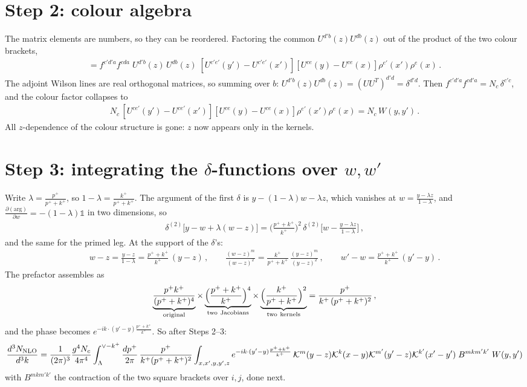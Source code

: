 \documentclass[9pt]{article}
\begin{document}
\section{Step 2: colour algebra}
The matrix elements are numbers, so they can be reordered. Factoring the common
$U^{d'b}(z)U^{db}(z)$ out of the product of the two colour brackets,
\begin{align}
[\,\cdots'][\,\cdots]=f^{c'd'a}f^{cda}\;U^{d'b}(z)\,U^{db}(z)\;
\left[U^{c'e'}(y')-U^{c'e'}(x')\right]\left[U^{ce}(y)-U^{ce}(x)\right]\rho^{e'}(x')\rho^{e}(x)\,.
\end{align}
The adjoint Wilson lines are real orthogonal matrices, so summing over $b$:
$U^{d'b}(z)U^{db}(z)=(UU^{T})^{d'd}=\delta^{d'd}$. Then
$f^{c'd'a}f^{cd'a}=N_{c}\,\delta^{c'c}$, and the colour factor collapses to
\begin{align}
N_{c}\,\left[U^{ce'}(y')-U^{ce'}(x')\right]\left[U^{ce}(y)-U^{ce}(x)\right]\rho^{e'}(x')\rho^{e}(x)
=N_{c}\,W(y,y')\,.
\end{align}
All $z$-dependence of the colour structure is gone: $z$ now appears only in the kernels.

\section{Step 3: integrating the $\delta$-functions over $w,w'$}
Write $\lambda=\frac{p^{+}}{p^{+}+k^{+}}$, so $1-\lambda=\frac{k^{+}}{p^{+}+k^{+}}$. The
argument of the first $\delta$ is $y-(1-\lambda)w-\lambda z$, which vanishes at
$w=\frac{y-\lambda z}{1-\lambda}$, and $\frac{\partial(\text{arg})}{\partial w}=-(1-\lambda)\mathbb 1$ in
two dimensions, so
\begin{align}
\delta^{(2)}\big[y-w+\lambda(w-z)\big]
=\Big(\frac{p^{+}+k^{+}}{k^{+}}\Big)^{2}\,
\delta^{(2)}\Big[w-\frac{y-\lambda z}{1-\lambda}\Big]\,,
\end{align}
and the same for the primed leg. At the support of the $\delta$'s:
\begin{align}
w-z=\frac{y-z}{1-\lambda}=\frac{p^{+}+k^{+}}{k^{+}}\,(y-z)\,,\qquad
\frac{(w-z)^{m}}{(w-z)^{2}}=\frac{k^{+}}{p^{+}+k^{+}}\,\frac{(y-z)^{m}}{(y-z)^{2}}\,,\qquad
w'-w=\frac{p^{+}+k^{+}}{k^{+}}\,(y'-y)\,.
\end{align}
The prefactor assembles as
\begin{align}
\underbrace{\frac{p^{+}k^{+}}{(p^{+}+k^{+})^{4}}}_{\rm original}\times
\underbrace{\Big(\frac{p^{+}+k^{+}}{k^{+}}\Big)^{4}}_{\rm two\ Jacobians}\times
\underbrace{\Big(\frac{k^{+}}{p^{+}+k^{+}}\Big)^{2}}_{\rm two\ kernels}
=\frac{p^{+}}{k^{+}\,(p^{+}+k^{+})^{2}}\,,
\end{align}
and the phase becomes $e^{-ik\cdot(y'-y)\frac{p^{+}+k^{+}}{k^{+}}}$. So after Steps 2--3:
\begin{align}\label{eq:afterdelta}
\frac{d^{3}N_{\rm NLO}}{d^{3}k}
=\frac{1}{(2\pi)^{3}}\frac{g^{4}N_{c}}{4\pi^{4}}
\int_{\Lambda}^{\vee-k^{+}}\frac{dp^{+}}{2\pi}\,\frac{p^{+}}{k^{+}(p^{+}+k^{+})^{2}}
\int_{x,x',y,y',z} e^{-ik\cdot(y'-y)\frac{p^{+}+k^{+}}{k^{+}}}\,
\mathcal K^{m}(y-z)\mathcal K^{k}(x-y)\mathcal K^{m'}(y'-z)\mathcal K^{k'}(x'-y')\;
B^{mkm'k'}\;W(y,y')
\end{align}
with $B^{mkm'k'}$ the contraction of the two square brackets over $i,j$, done next.
\end{document}
